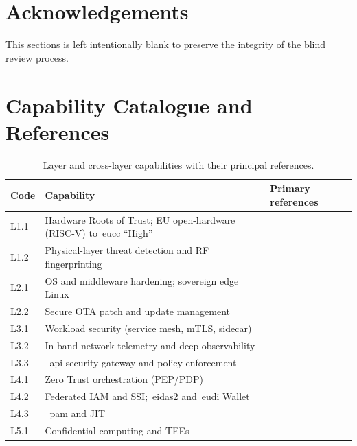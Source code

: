 \documentclass{ieeeaccess}
\begin{document}
\section*{Acknowledgements}
This sections is left intentionally blank to preserve the integrity of the blind review process.




\appendix
\section{Capability Catalogue and References}
\label{app:capabilities}

\begin{table}[t]
\caption{Layer and cross-layer capabilities with their principal references.}
\label{tab:capabilities}
\centering
\footnotesize
\begin{tabularx}{\textwidth}{@{}lXl@{}}
\toprule
\textbf{Code} & \textbf{Capability} & \textbf{Primary references} \\
\midrule
L1.1 & Hardware Roots of Trust; EU open-hardware (RISC-V) to~\gls{eucc} ``High''
  &~\cite{tpm2spec,sailer2004,opentitan2024,keystone2020,eurohpcdare2025} \\
L1.2 & Physical-layer threat detection and RF fingerprinting
  &~\cite{alwarafy2021,ranaweera2021,harizaj2026dual} \\
L2.1 & OS and middleware hardening; sovereign edge Linux
  &~\cite{chandramouli2022devsecops,rose2020zta} \\
L2.2 & Secure OTA patch and update management
  &~\cite{ietfrfc9019,uptanestd} \\
L3.1 & Workload security (service mesh, mTLS, sidecar)
  &~\cite{chandramouli2019,chandramouli2020} \\
L3.2 & In-band network telemetry and deep observability
  &~\cite{chandramouli2019,chandramouli2020} \\
L3.3 &~\gls{api} security gateway and policy enforcement
  &~\cite{owaspapi,chandramouli2022devsecops} \\
L4.1 & Zero Trust orchestration (PEP/PDP)
  &~\cite{rose2020zta,chandramouli2023zta} \\
L4.2 & Federated IAM and SSI;~\gls{eidas2} and~\gls{eudi} Wallet
  &~\cite{w3cvc2025,eueidas2,eudiwallet2024,eudiwallet2026} \\
L4.3 & ~\acrfull{pam} and JIT
  &~\cite{rose2020zta,chandramouli2023zta} \\
L5.1 & Confidential computing and TEEs

\end{tabularx}
\end{table}
\end{document}
